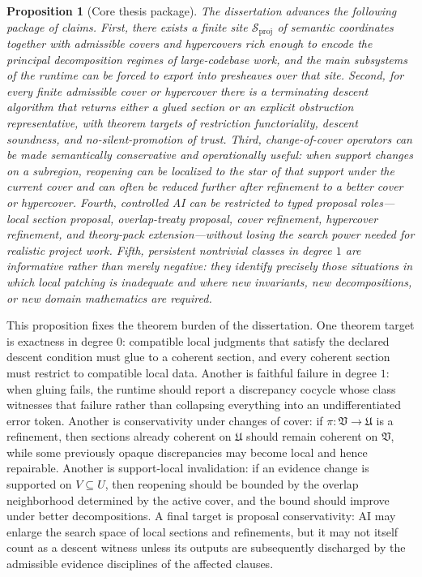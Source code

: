 \documentclass[11pt]{report}
\newtheorem{proposition}[definition]{Proposition}
\begin{document}
\begin{proposition}[Core thesis package]
The dissertation advances the following package of claims. First, there exists a finite site $\mathcal{S}_{\mathrm{proj}}$ of semantic coordinates together with admissible covers and hypercovers rich enough to encode the principal decomposition regimes of large-codebase work, and the main subsystems of the runtime can be forced to export into presheaves over that site. Second, for every finite admissible cover or hypercover there is a terminating descent algorithm that returns either a glued section or an explicit obstruction representative, with theorem targets of restriction functoriality, descent soundness, and no-silent-promotion of trust. Third, change-of-cover operators can be made semantically conservative and operationally useful: when support changes on a subregion, reopening can be localized to the star of that support under the current cover and can often be reduced further after refinement to a better cover or hypercover. Fourth, controlled AI can be restricted to typed proposal roles---local section proposal, overlap-treaty proposal, cover refinement, hypercover refinement, and theory-pack extension---without losing the search power needed for realistic project work. Fifth, persistent nontrivial classes in degree $1$ are informative rather than merely negative: they identify precisely those situations in which local patching is inadequate and where new invariants, new decompositions, or new domain mathematics are required.
\end{proposition}

This proposition fixes the theorem burden of the dissertation. One theorem target is exactness in degree $0$: compatible local judgments that satisfy the declared descent condition must glue to a coherent section, and every coherent section must restrict to compatible local data. Another is faithful failure in degree $1$: when gluing fails, the runtime should report a discrepancy cocycle whose class witnesses that failure rather than collapsing everything into an undifferentiated error token. Another is conservativity under changes of cover: if $\pi:\mathfrak{V}\to\mathfrak{U}$ is a refinement, then sections already coherent on $\mathfrak{U}$ should remain coherent on $\mathfrak{V}$, while some previously opaque discrepancies may become local and hence repairable. Another is support-local invalidation: if an evidence change is supported on $V\subseteq U$, then reopening should be bounded by the overlap neighborhood determined by the active cover, and the bound should improve under better decompositions. A final target is proposal conservativity: AI may enlarge the search space of local sections and refinements, but it may not itself count as a descent witness unless its outputs are subsequently discharged by the admissible evidence disciplines of the affected clauses.
\end{document}
